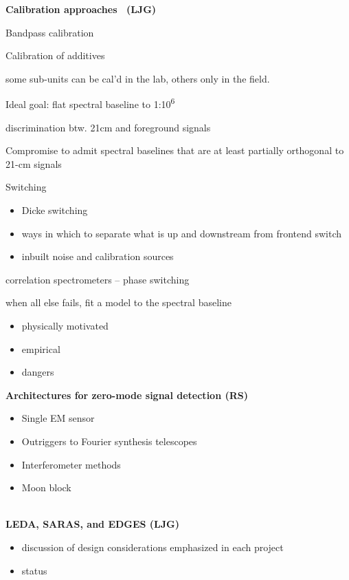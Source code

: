 \textbf{Calibration approaches{~ }(LJG)}

Bandpass calibration

Calibration of additives

some sub-units can be cal'd in the lab, others only in the field.

Ideal goal: flat spectral baseline to 1:10\textsuperscript{6}{~}

discrimination btw. 21cm and foreground signals

Compromise to admit spectral baselines that are at least partially
orthogonal to 21-cm signals

Switching

\begin{itemize}
\item
  Dicke switching
\item
  ways in which to separate what is up and downstream from frontend
  switch
\item
  inbuilt noise and calibration sources
\end{itemize}

correlation spectrometers -- phase switching

when all else fails, fit a model to the spectral baseline

\begin{itemize}
\item
  physically motivated
\item
  empirical
\item
  dangers
\end{itemize}

\textbf{Architectures for zero-mode signal detection (RS)}

\begin{itemize}
\item
  Single EM sensor
\item
  Outriggers to Fourier synthesis telescopes
\item
  Interferometer methods
\item
  Moon block
\end{itemize}

\emph{}\\

\textbf{LEDA, SARAS, and EDGES (LJG)}

\begin{itemize}
\item
  discussion of design considerations emphasized in each project
\item
  status
\end{itemize}

